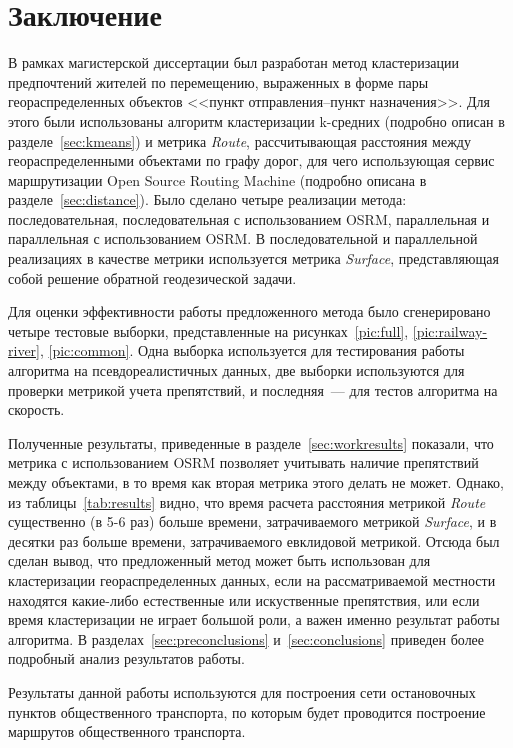 \part{Заключение}
В рамках магистерской диссертации был разработан метод кластеризации предпочтений жителей по перемещению, выраженных в форме пары геораспределенных объектов <<пункт отправления--пункт назначения>>. Для этого были использованы алгоритм кластеризации k-средних (подробно описан в разделе~\ref{sec:kmeans}) и метрика \emph{Route}, рассчитывающая расстояния между геораспределенными объектами по графу дорог, для чего использующая сервис маршрутизации Open Source Routing Machine (подробно описана в разделе~\ref{sec:distance}). Было сделано четыре реализации метода: последовательная, последовательная с использованием OSRM, параллельная и параллельная с использованием OSRM. В последовательной и параллельной реализациях в качестве метрики используется метрика \emph{Surface}, представляющая собой решение обратной геодезической задачи.

Для оценки эффективности работы предложенного метода было сгенерировано четыре тестовые выборки, представленные на рисунках~\ref{pic:full}, \ref{pic:railway-river}, \ref{pic:common}. Одна выборка используется для тестирования работы алгоритма на псевдореалистичных данных, две выборки используются для проверки метрикой учета препятствий, и последняя~--- для тестов алгоритма на скорость.

Полученные результаты, приведенные в разделе~\ref{sec:workresults} показали, что метрика с использованием OSRM позволяет учитывать наличие препятствий между объектами, в то время как вторая метрика этого делать не может. Однако, из таблицы~\ref{tab:results} видно, что время расчета расстояния метрикой \emph{Route} существенно (в 5-6 раз) больше времени, затрачиваемого метрикой \emph{Surface}, и в десятки раз больше времени, затрачиваемого евклидовой метрикой. Отсюда был сделан вывод, что предложенный метод может быть использован для кластеризации геораспределенных данных, если на рассматриваемой местности находятся какие-либо естественные или искуственные препятствия, или если время кластеризации не играет большой роли, а важен именно результат работы алгоритма. В разделах~\ref{sec:preconclusions} и~\ref{sec:conclusions} приведен более подробный анализ результатов работы.

Результаты данной работы используются для построения сети остановочных пунктов общественного транспорта, по которым будет проводится построение маршрутов общественного транспорта.
